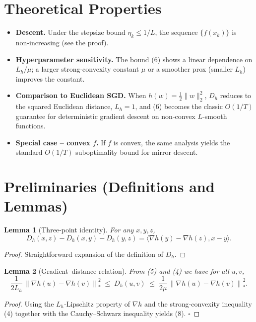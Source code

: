 \documentclass{article}
\newtheorem{lemma}{Lemma}
\newcommand{\dualnorm}[1]{\left\lVert#1\right\rVert_{*}}
\newcommand{\inner}[2]{\langle #1,#2\rangle}
\newcommand{\D}[2]{D_{h}(#1,#2)}
\begin{document}
\section*{Theoretical Properties}
\begin{itemize}[leftmargin=*]
\item \textbf{Descent.} Under the stepsize bound $\eta_k\le1/L$, the
sequence $\{f(x_k)\}$ is non‑increasing (see the proof).
\item \textbf{Hyperparameter sensitivity.}
The bound (6) shows a linear dependence on $L_h/\mu$; a larger
strong‑convexity constant $\mu$ or a smoother prox (smaller $L_h$)
improves the constant.
\item \textbf{Comparison to Euclidean SGD.}
When $h(w)=\tfrac12\|w\|_2^{2}$, $D_h$ reduces to the squared Euclidean
distance, $L_h=1$, and (6) becomes the classic $O(1/T)$ guarantee for
deterministic gradient descent on non‑convex $L$‑smooth functions.
\item \textbf{Special case – convex $f$.}
If $f$ is convex, the same analysis yields the standard $O(1/T)$
suboptimality bound for mirror descent.
\end{itemize}

\section*{Preliminaries (Definitions and Lemmas)}
\begin{lemma}[Three‑point identity]\label{lem:three}
For any $x,y,z$,
\[
\D{x}{z}-\D{x}{y}-\D{y}{z}
    =\inner{\nabla h(y)-\nabla h(z)}{x-y}.
\tag{7}
\]
\end{lemma}
\begin{proof}
Straightforward expansion of the definition of $D_h$.
\end{proof}

\begin{lemma}[Gradient–distance relation]\label{lem:graddist}
From (5) and (4) we have for all $u,v$,
\[
\frac{1}{2L_h}\,\dualnorm{\nabla h(u)-\nabla h(v)}^{2}
\;\le\;
\D{u}{v}
\;\le\;
\frac{1}{2\mu}\,\dualnorm{\nabla h(u)-\nabla h(v)}^{2}.
\tag{8}
\]
\end{lemma}
\begin{proof}
Using the $L_h$‑Lipschitz property of $\nabla h$ and the
strong‑convexity inequality (4) together with the Cauchy–Schwarz
inequality yields (8). \hfill $\square$
\end{proof}
\end{document}
